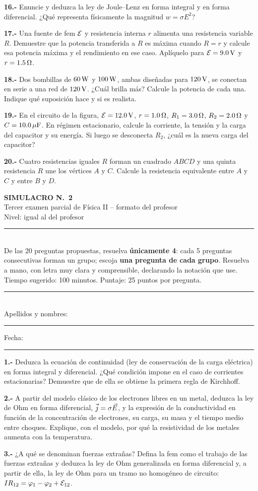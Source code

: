\documentclass[11pt]{article}
\newcommand{\cabecera}[3]{%
\begin{center}
{\Large\bfseries SIMULACRO N.\textordmasculine\ #1}\\[2pt]
{\large Tercer examen parcial de Física II -- formato del profesor}\\[2pt]
{\normalsize Nivel: #2}
\end{center}
\noindent\rule{\linewidth}{0.6pt}\\
{\small De las 20 preguntas propuestas, resuelva \textbf{únicamente 4}: cada 5 preguntas consecutivas forman un grupo; escoja \textbf{una pregunta de cada grupo}. Resuelva a mano, con letra muy clara y comprensible, declarando la notación que use. Tiempo sugerido: #3. Puntaje: 25 puntos por pregunta.}\\
\noindent\rule{\linewidth}{0.6pt}\\[2pt]
Apellidos y nombres: \rule{6.5cm}{0.4pt}\hfill Fecha: \rule{3cm}{0.4pt}\par\medskip}
\newcommand{\grupo}[1]{\par\medskip{\color{azul}\bfseries Grupo #1}\par\smallskip}
\newcommand{\p}[1]{\par\smallskip\textbf{#1.-} }
\begin{document}
\grupo{IV}
\p{16} Enuncie y deduzca la ley de Joule--Lenz en forma integral y en forma diferencial. ¿Qué representa físicamente la magnitud $w=\sigma E^2$?

\p{17} Una fuente de fem $\fem$ y resistencia interna $r$ alimenta una resistencia variable $R$. Demuestre que la potencia transferida a $R$ es máxima cuando $R=r$ y calcule esa potencia máxima y el rendimiento en ese caso. Aplíquelo para $\fem=9.0\uu{V}$ y $r=1.5\ohm$.

\p{18} Dos bombillas de $60\uu{W}$ y $100\uu{W}$, ambas diseñadas para $120\uu{V}$, se conectan en serie a una red de $120\uu{V}$. ¿Cuál brilla más? Calcule la potencia de cada una. Indique qué suposición hace y si es realista.

\p{19} En el circuito de la figura, $\fem=12.0\uu{V}$, $r=1.0\ohm$, $R_1=3.0\ohm$, $R_2=2.0\ohm$ y $C=10.0\uu{\mu F}$. En régimen estacionario, calcule la corriente, la tensión y la carga del capacitor y su energía. Si luego se desconecta $R_2$, ¿cuál es la nueva carga del capacitor?
\begin{center}\circSunoQdiecinueve\end{center}

\p{20} Cuatro resistencias iguales $R$ forman un cuadrado $ABCD$ y una quinta resistencia $R$ une los vértices $A$ y $C$. Calcule la resistencia equivalente entre $A$ y $C$ y entre $B$ y $D$.
\begin{center}\circCuadrado\end{center}

\newpage
\cabecera{2}{igual al del profesor}{100 minutos}

\grupo{I}
\p{1} Deduzca la ecuación de continuidad (ley de conservación de la carga eléctrica) en forma integral y diferencial. ¿Qué condición impone en el caso de corrientes estacionarias? Demuestre que de ella se obtiene la primera regla de Kirchhoff.

\p{2} A partir del modelo clásico de los electrones libres en un metal, deduzca la ley de Ohm en forma diferencial, $\vj=\sigma\vE$, y la expresión de la conductividad en función de la concentración de electrones, su carga, su masa y el tiempo medio entre choques. Explique, con el modelo, por qué la resistividad de los metales aumenta con la temperatura.

\p{3} ¿A qué se denominan fuerzas extrañas? Defina la fem como el trabajo de las fuerzas extrañas y deduzca la ley de Ohm generalizada en forma diferencial y, a partir de ella, la ley de Ohm para un tramo no homogéneo de circuito: $IR_{12}=\varphi_1-\varphi_2+\fem_{12}$.
\end{document}
